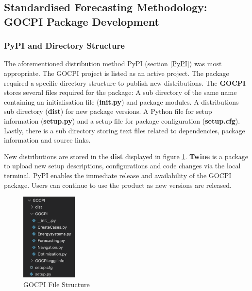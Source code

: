 \documentclass[12pt]{article}
\begin{document}
\subsection{Standardised Forecasting Methodology: GOCPI Package Development}
\subsubsection{PyPI and Directory Structure}
The aforementioned distribution method PyPI (section \ref{PyPI}) was most appropriate.
The GOCPI project is listed as an active project.
The package required a specific directory structure to publish new distributions.
The \textbf{GOCPI} stores several files required for the package: 
A sub directory of the same name containing an initialisation file (\textbf{init.py}) and package modules. 
A distributions sub directory (\textbf{dist}) for new package versions. 
A Python file for setup information (\textbf{setup.py}) and a setup file for package configuration (\textbf{setup.cfg}).
Lastly, there is a sub directory storing text files related to dependencies, package information and source links.

New distributions are stored in the \textbf{dist} displayed in figure \ref{fig:GPS}.
\textbf{Twine} is a package to upload new setup descriptions, configurations and code changes via the local terminal.
PyPI enables the immediate release and availability of the GOCPI package.
Users can continue to use the product as new versions are released.

\begin{figure}
	\centering
	\includegraphics[width = 0.25\textwidth]{GOCPI-package-structure}
	\caption{GOCPI File Structure}
	\label{fig:GPS}
\end{figure}
\end{document}

